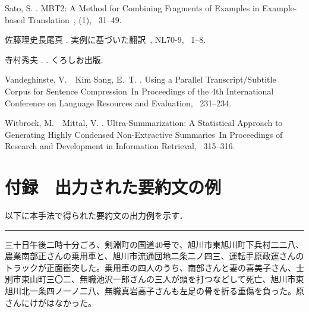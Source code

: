 \documentclass[japanese]{jnlp_1.4}
\begin{document}
\begin{thebibliography}{}
Sato, S. \BBCP.
\newblock \BBOQ MBT2: A Method for Combining Fragments of Examples in
  Example-based Translation\BBCQ\
, {}  (1), \mbox{\BPGS\ 31--49}.

佐藤理史\JBA 長尾真 \BBOP 1989\BBCP.
\newblock \JBOQ 実例に基づいた翻訳\JBCQ\
\newblock {}, {\Bbf NL70-9}, \mbox{\BPGS\ 1--8}.

寺村秀夫 \BBCP.
\newblock {}.
\newblock くろしお出版.

Vandeghinste, V.\BBACOMMA\ \BBA\ {Kim Sang}, E.~T. \BBOP 2004\BBCP.
\newblock \BBOQ Using a Parallel Transcript/Subtitle Corpus for Sentence
  Compression\BBCQ\
\newblock In {\Bem Proceedings of the 4th International Conference on Language
  Resources and Evaluation}, \mbox{\BPGS\ 231--234}.

Witbrock, M.\BBACOMMA\ \BBA\ Mittal, V. \BBOP 1999\BBCP.
\newblock \BBOQ Ultra-Summarization: A Statistical Approach to Generating
  Highly Condensed Non-Extractive Summaries\BBCQ\
\newblock In {\Bem Proceedings of Research and Development in Information
  Retrieval}, \mbox{\BPGS\ 315--316}.

\end{thebibliography}



\section*{付録　出力された要約文の例}

\vspace{-0.5\baselineskip}
以下に本手法で得られた要約文の出力例を示す．

\newenvironment{InL}{}{}
\small
\vspace{0.5\baselineskip}
\hrule
\vspace{0.5\baselineskip}


\begin{InL}
三十日午後二時十分ごろ、剣淵町の国道40号で、旭川市東旭川町下兵村二二八、農業南部正さんの乗用車と、旭川市流通団地二条二ノ四三、運転手原政運さんのトラックが正面衝突した。乗用車の四人のうち、南部さんと妻の喜美子さん、士別市東山町三〇二、無職池沢一郎さんの三人が頭を打つなどして死亡、旭川市東旭川北一条四ノ一ノ二八、無職真岩高子さんも左足の骨を折る重傷を負った。原さんにけがはなかった。
\end{InL}
\end{document}
